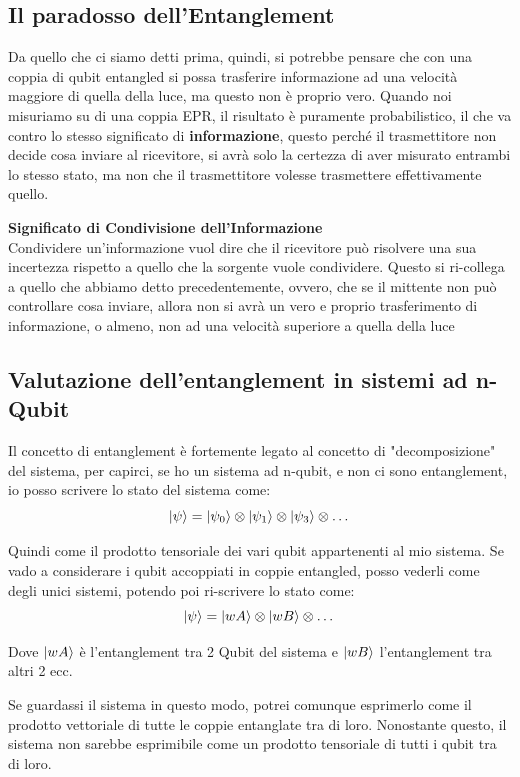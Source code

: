 \subsection{Il paradosso dell'Entanglement}
Da quello che ci siamo detti prima, quindi, si potrebbe pensare che con una coppia di qubit entangled si possa trasferire informazione ad una velocità maggiore di quella della luce, ma questo non è proprio vero. Quando noi misuriamo su di una coppia EPR, il risultato è puramente probabilistico, il che va contro lo stesso significato di \textbf{informazione}, questo perché il trasmettitore non decide cosa inviare al ricevitore, si avrà solo la certezza di aver misurato entrambi lo stesso stato, ma non che il trasmettitore volesse trasmettere effettivamente quello.

\begin{info}
\textbf{Significato di Condivisione dell'Informazione}\\
Condividere un'informazione vuol dire che il ricevitore può risolvere una sua incertezza rispetto a quello che la sorgente vuole condividere.
Questo si ri-collega a quello che abbiamo detto precedentemente, ovvero, che se il mittente non può controllare cosa inviare, allora non si avrà un vero e proprio trasferimento di informazione, o almeno, non ad una velocità superiore a quella della luce
\end{info}

\subsection{Valutazione dell'entanglement in sistemi ad n-Qubit}
Il concetto di entanglement è fortemente legato al concetto di "decomposizione" del sistema, per capirci, se ho un sistema ad n-qubit, e non ci sono entanglement, io posso scrivere lo stato del sistema come:
\[
\ket{\psi} = \ket{\psi_0} \otimes \ket{\psi_1} \otimes \ket{\psi_3} \otimes \dots 
\]

Quindi come il prodotto tensoriale dei vari qubit appartenenti al mio sistema. Se vado a considerare i qubit accoppiati in coppie entangled, posso vederli come degli unici sistemi, potendo poi ri-scrivere lo stato come:
\[
\ket{\psi} = \ket{wA} \otimes \ket{wB} \otimes \dots
\]

Dove \(\ket{wA}\) è l'entanglement tra 2 Qubit del sistema e \(\ket{wB}\) l'entanglement tra altri 2 ecc. 

Se guardassi il sistema in questo modo, potrei comunque esprimerlo come il prodotto vettoriale di tutte le coppie entanglate tra di loro. Nonostante questo, il sistema non sarebbe esprimibile come un prodotto tensoriale di tutti i qubit tra di loro. 

